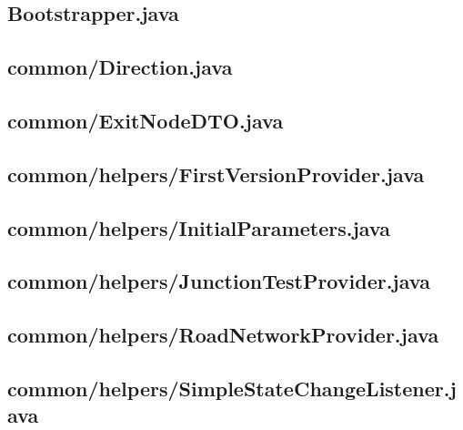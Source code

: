 
\newpage
\subsection{Bootstrapper.java}

\newpage
\subsection{common/Direction.java}

\newpage
\subsection{common/ExitNodeDTO.java}

\newpage
\subsection{common/helpers/FirstVersionProvider.java}

\newpage
\subsection{common/helpers/InitialParameters.java}

\newpage
\subsection{common/helpers/JunctionTestProvider.java}

\newpage
\subsection{common/helpers/RoadNetworkProvider.java}

\newpage
\subsection{common/helpers/SimpleStateChangeListener.java}

\newpage
